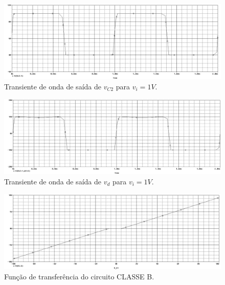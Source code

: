 \documentclass[12pt, a4paper]{article}
\begin{document}
    \newpage
    
    \begin{figure}[h!] 
        \centering
        \includegraphics[width=1\textheight, angle=-90]{ondavc2satcutoff}
        \caption{Transiente de onda de saída de \(v_{C2}\) para \(v_i = 1V\).}        
        \label{ondavc2satcutoff}
    \end{figure}
    
    \newpage
    
    \begin{figure}[h!] 
        \centering
        \includegraphics[width=1\textheight, angle=-90]{ondavdcutoff}
        \caption{Transiente de onda de saída de \(v_{d}\) para \(v_i = 1V\).}        
        \label{ondavdcutoff}
    \end{figure}
    
    \newpage
    
    \begin{figure}[h!] 
        \centering
        \includegraphics[width=1\textheight, angle=-90]{graf421}
        \caption{Função de transferência do circuito CLASSE B.}        
        \label{graf421}
    \end{figure}
    
\end{document}
